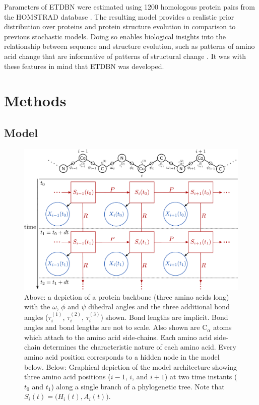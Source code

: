 \documentclass[nogrid]{MBE}%
\begin{document}
Parameters of ETDBN were estimated using 1200 homologous protein pairs from the HOMSTRAD database \citep{mizuguchi1998homstrad}. The resulting model provides a realistic prior distribution over proteins and protein structure evolution in comparison to previous stochastic models. Doing so enables biological insights into the relationship between sequence and structure evolution, such as patterns of amino acid change that are informative of patterns of structural change \citep{grishin2001fold}. It was with these features in mind that ETDBN was developed.

\section{Methods}

\subsection{Model}
\begin{figure}
	\centering
	\includegraphics[width=1.75\columnwidth]{figures/model-structure-alt-final.pdf}
	\caption{Above: a depiction of a protein backbone (three amino acids long) with the $\omega$, $\phi$ and $\psi$ dihedral angles and the three additional bond angles ($\tau^{(1)}_{i}$, $\tau^{(2)}_{i}$, $\tau^{(3)}_{i}$) shown. Bond lengths are implicit. Bond angles and bond lengths are not to scale. Also shown are $\text{C}_{\alpha}$ atoms which attach to the amino acid side-chains. Each amino acid side-chain determines the characteristic nature of each amino acid. Every amino acid position corresponds to a hidden node in the model below.\newline
	Below: Graphical depiction of the model architecture showing three amino acid positions ($i-1$, $i$, and $i+1$) at two time instants ($t_0$ and $t_1$) along a single branch of a phylogenetic tree. Note that $S_{i}(t)=\big(H_{i}(t),A_{i}(t)\big)$.}%
	\label{fig:model-structure}%
\end{figure}
\end{document}
